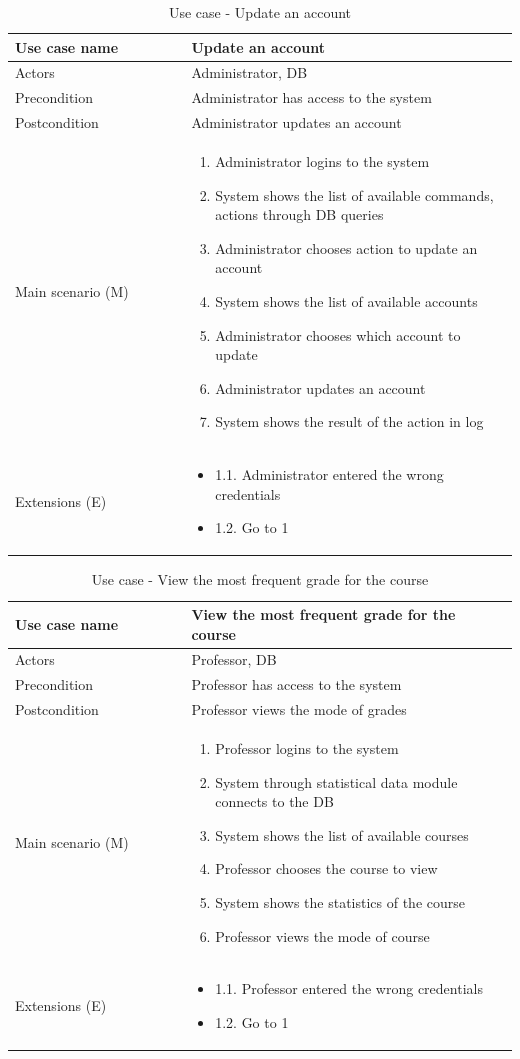 \documentclass[12pt]{article}
\newcommand\tabularhead[1]{
\begin{table}[h]
  \caption{Use case - #1}
  \begin{tabular}{|p{0.35\linewidth}|p{0.65\linewidth}|}
    \hline
    \textbf{Use case name} & \textbf{#1} \\
    \hline}
\newcommand\addrow[2]{#1 &#2\\ \hline}
\newcommand\adddoublerow[2]{\begin{minipage}[t][][t]{2.5cm}#1\end{minipage}%
    &\begin{minipage}[t][][t]{\linewidth}
     \begin{itemize}\setlength{\itemsep}{0pt}%
        #2     
     \end{itemize}
     \end{minipage}\\ \hline}
\newcommand\addmulrow[2]{ \begin{minipage}[t][][t]{2.5cm}#1\end{minipage}%
     &\begin{minipage}[t][][t]{\linewidth}
      \begin{enumerate}\setlength{\itemsep}{0pt}%
        #2   
      \end{enumerate}
      \end{minipage}\\ \hline}
\newenvironment{usecase}{\tabularhead}
{\hline\end{tabular}\end{table}}
\begin{document}
\begin{usecase}{Update an account}
    \addrow{Actors}{Administrator, DB}
    \addrow{Precondition}{Administrator has access to the system}
    \addrow{Postcondition}{Administrator updates an account}
    \addmulrow{Main scenario (M)}{
        \item Administrator logins to the system
        \item System shows the list of available commands, actions through DB queries
        \item Administrator chooses action to update an account
        \item System shows the list of available accounts
        \item Administrator chooses which account to update
        \item Administrator updates an account
        \item System shows the result of the action in log
    }
    \adddoublerow{Extensions (E)}{
        \item[] 1.1. Administrator entered the wrong credentials
        \item[] 1.2. Go to 1
    }
\end{usecase}
\newpage
\begin{usecase}{View the most frequent grade for the course}
    \addrow{Actors}{Professor, DB}
    \addrow{Precondition}{Professor has access to the system}
    \addrow{Postcondition}{Professor views the mode of grades}
    \addmulrow{Main scenario (M)}{
        \item Professor logins to the system
        \item System through statistical data module connects to the DB
        \item System shows the list of available courses
        \item Professor chooses the course to view
        \item System shows the statistics of the course
        \item Professor views the mode of course
    }
    \adddoublerow{Extensions (E)}{
        \item[] 1.1. Professor entered the wrong credentials
        \item[] 1.2. Go to 1
    }
\end{usecase}
\end{document}
